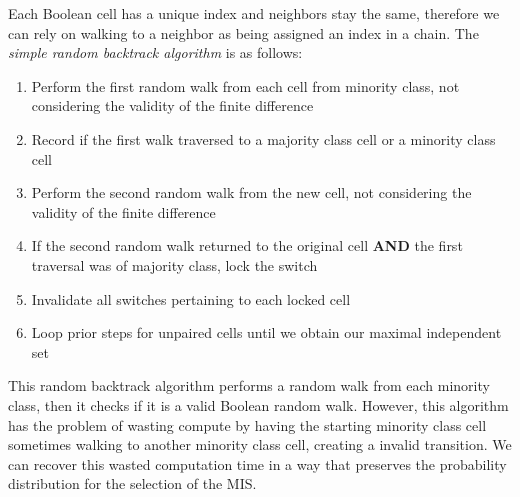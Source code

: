 \documentclass[10pt, a5paper, twoside, openright]{memoir}
\begin{document}
Each Boolean cell has a unique index and neighbors stay the same, therefore we can rely on walking to a neighbor as being assigned an index in a chain. The \textit{simple random backtrack algorithm} is as follows:
\begin{enumerate}
\item Perform the first random walk from each cell from minority class, not considering the validity of the finite difference
\item Record if the first walk traversed to a majority class cell or a minority class cell
\item Perform the second random walk from the new cell, not considering the validity of the finite difference
\item If the second random walk returned to the original cell \textbf{AND} the first traversal was of majority class, lock the switch
\item Invalidate all switches pertaining to each locked cell
\item Loop prior steps for unpaired cells until we obtain our maximal independent set
\end{enumerate}
This random backtrack algorithm performs a random walk from each minority class, then it checks if it is a valid Boolean random walk. However, this algorithm has the problem of wasting compute by having the starting minority class cell sometimes walking to another minority class cell, creating a invalid transition. We can recover this wasted computation time in a way that preserves the probability distribution for the selection of the MIS.
\end{document}
